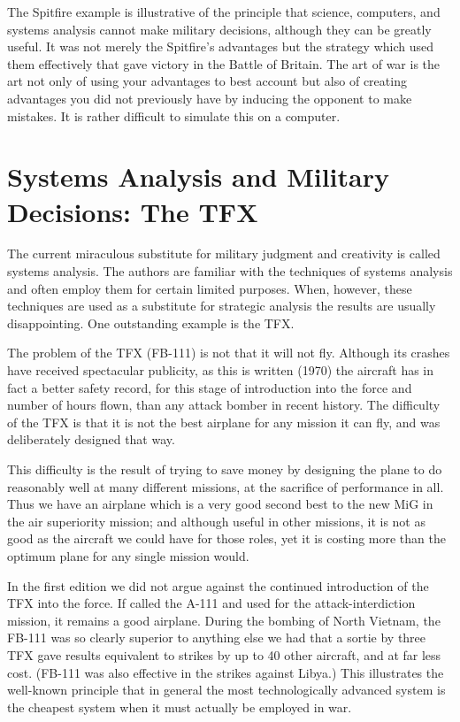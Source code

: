 The Spitfire example is illustrative of the principle that science, computers, and systems analysis cannot make military decisions, although they can be greatly useful. It was not merely the Spitfire's advantages but the strategy which used them effectively that gave victory in the Battle of Britain. The art of war is the art not only of using your advantages to best account but also of creating advantages you did not previously have by inducing the opponent to make mistakes. It is rather difficult to simulate this on a computer.

\section{Systems Analysis and Military Decisions: The TFX}
The current miraculous substitute for military judgment and creativity is called systems analysis. The authors are familiar with the techniques of systems analysis and often employ them for certain limited purposes. When, however, these techniques are used as a substitute for strategic analysis the results are usually disappointing. One outstanding example is the TFX.

The problem of the TFX (FB-111) is not that it will not fly. Although its crashes have received spectacular publicity, as this is written (1970) the aircraft has in fact a better safety record, for this stage of introduction into the force and number of hours flown, than any attack bomber in recent history. The difficulty of the TFX is that it is not the best airplane for any mission it can fly, and was deliberately designed that way.

This difficulty is the result of trying to save money by designing the plane to do reasonably well at many different missions, at the sacrifice of performance in all. Thus we have an airplane which is a very good second best to the new MiG in the air superiority mission; and although useful in other missions, it is not as good as the aircraft we could have for those roles, yet it is costing more than the optimum plane for any single mission would.

In the first edition we did not argue against the continued introduction of the TFX into the force. If called the A-111 and used for the attack-interdiction mission, it remains a good airplane. During the bombing of North Vietnam, the FB-111 was so clearly superior to anything else we had that a sortie by three TFX gave results equivalent to strikes by up to 40 other aircraft, and at far less cost. (FB-111 was also effective in the strikes against Libya.) This illustrates the well-known principle that in general the most technologically advanced system is the cheapest system when it must actually be employed in war.

